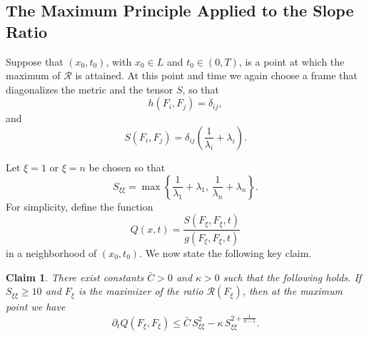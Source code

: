 \documentclass[12pt,letterpaper]{amsart}%
\newcounter{mycounter}
\numberwithin{mycounter}{section}
\theoremstyle{plain}
\newtheorem{claim}[mycounter]{Claim}
\numberwithin{equation}{section}
\theoremstyle{definition}
\newcommand{\maxidx}{\mathord{\xi}} %
\begin{document}
\subsection{The Maximum Principle Applied to the Slope Ratio}



\bigskip
Suppose that $(x_0,t_0)$, with $x_0\in L$ and $t_0\in(0,T)$, is a point at which the maximum of $\mathcal{R}$ is attained. At this point and time we again choose a frame that diagonalizes the metric and the tensor $S$, so that
\[
h(F_i,F_j)=\delta_{ij},
\]
and
\[
S(F_i,F_j)=\delta_{ij}\left(\frac{1}{\lambda_i}+\lambda_i\right).
\]

Let $\maxidx=1$ or $\maxidx=n$ be chosen so that
\[
S_{\maxidx\maxidx}=\max\left\{\frac{1}{\lambda_1}+\lambda_1,\,
\frac{1}{\lambda_n}+\lambda_n\right\}.
\]
For simplicity, define the function
\[
Q(x,t)=\frac{S(F_{\maxidx},F_{\maxidx},t)}{g(F_{\maxidx},F_{\maxidx},t)}
\]
in a neighborhood of $(x_0,t_0)$. We now state the following key claim.

\begin{claim}
There exist constants $\bar C>0$ and $\kappa>0$ such that the following holds. 
If $S_{\maxidx\maxidx}\ge 10$ and $F_{\maxidx}$ is the maximizer of the ratio $\mathcal{R}(F_{\maxidx})$, then at the maximum point we have
\[
\partial_t Q(F_{\maxidx},F_{\maxidx})
\le 
\bar C\, S_{\maxidx\maxidx}^2
-
\kappa\, S_{\maxidx\maxidx}^{2+\frac{1}{n-1}}.
\]
\end{claim}
\end{document}
